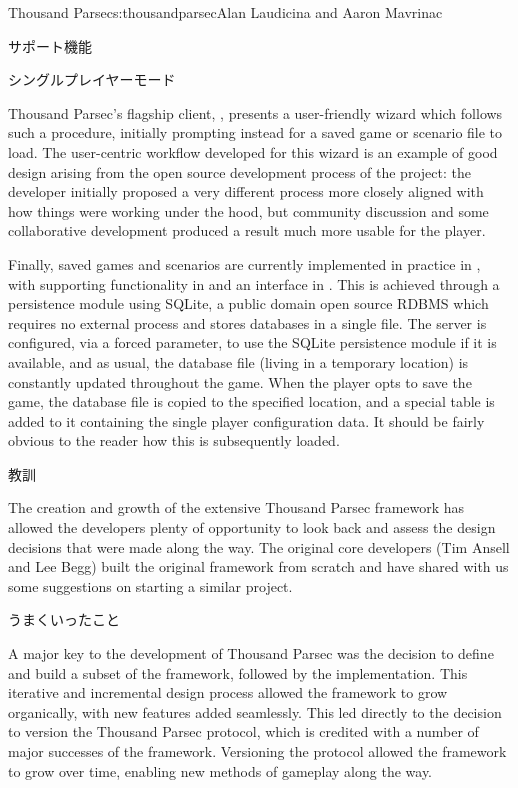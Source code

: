 \begin{aosachapter}{Thousand Parsec}{s:thousandparsec}{Alan Laudicina and Aaron Mavrinac}
\begin{aosasect1}{サポート機能}
\begin{aosasect2}{シングルプレイヤーモード}
\begin{aosaenumerate}
\end{aosaenumerate}

Thousand Parsec's flagship client, , presents a
user-friendly wizard which follows such a procedure, initially
prompting instead for a saved game or scenario file to load. The
user-centric workflow developed for this wizard is an example of good
design arising from the open source development process of the
project: the developer initially proposed a very different process
more closely aligned with how things were working under the hood, but
community discussion and some collaborative development produced a
result much more usable for the player.

Finally, saved games and scenarios are currently implemented in
practice in , with supporting functionality in
 and an interface in . This
is achieved through a persistence module using SQLite, a public domain
open source RDBMS which requires no external process and stores
databases in a single file. The server is configured, via a forced
parameter, to use the SQLite persistence module if it is available,
and as usual, the database file (living in a temporary location) is
constantly updated throughout the game. When the player opts to save
the game, the database file is copied to the specified location, and a
special table is added to it containing the single player
configuration data. It should be fairly obvious to the reader how this
is subsequently loaded.

\end{aosasect2}

\end{aosasect1}

\begin{aosasect1}{教訓}

The creation and growth of the extensive Thousand Parsec framework has
allowed the developers plenty of opportunity to look back and assess
the design decisions that were made along the way. The original core
developers (Tim Ansell and Lee Begg) built the original framework from
scratch and have shared with us some suggestions on starting a similar
project.

\begin{aosasect2}{うまくいったこと}

A major key to the development of Thousand Parsec was the decision to
define and build a subset of the framework, followed by the
implementation. This iterative and incremental design process allowed
the framework to grow organically, with new features added
seamlessly. This led directly to the decision to version the
Thousand Parsec protocol, which is credited with a number of major
successes of the framework. Versioning the protocol allowed the
framework to grow over time, enabling new methods of gameplay along
the way.


\end{aosasect2}
\end{aosasect1}
\end{aosachapter}
